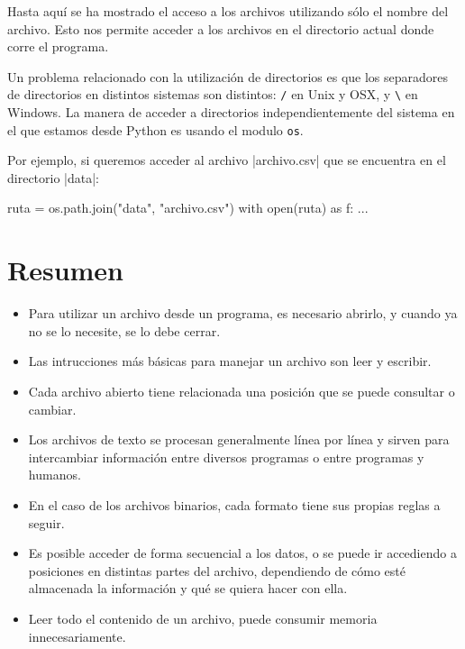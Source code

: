 Hasta aquí se ha mostrado el acceso a los archivos utilizando sólo el
nombre del archivo. Esto nos permite acceder a los archivos en el
directorio actual donde corre el programa.

Un problema relacionado con la utilización de directorios es que los
separadores de directorios en distintos sistemas son distintos: \verb!/! en
Unix y OSX, y \verb!\! en Windows. La manera de acceder a directorios
independientemente del sistema en el que estamos desde Python es usando el
modulo \lstinline!os!.

Por ejemplo, si queremos acceder al archivo |archivo.csv| que se encuentra en
el directorio |data|:

\begin{codigo-python-sn}
ruta = os.path.join("data", "archivo.csv")
with open(ruta) as f:
    ...
\end{codigo-python-sn}

\section{Resumen}

\begin{itemize}
\item Para utilizar un archivo desde un programa, es necesario abrirlo, y
cuando ya no se lo necesite, se lo debe cerrar.
\item Las intrucciones más básicas para manejar un archivo son leer y escribir.
\item Cada archivo abierto tiene relacionada una posición que se puede
consultar o cambiar.
\item Los archivos de texto se procesan generalmente línea por línea y
sirven para intercambiar información entre diversos programas o entre
programas y humanos.
\item En el caso de los archivos binarios, cada formato tiene sus propias
reglas a seguir.
\item Es posible acceder de forma secuencial a los datos, o se puede ir
accediendo a posiciones en distintas partes del archivo, dependiendo de
cómo esté almacenada la información y qué se quiera hacer con ella.
\item Leer todo el contenido de un archivo, puede consumir memoria
innecesariamente.
\end{itemize}

